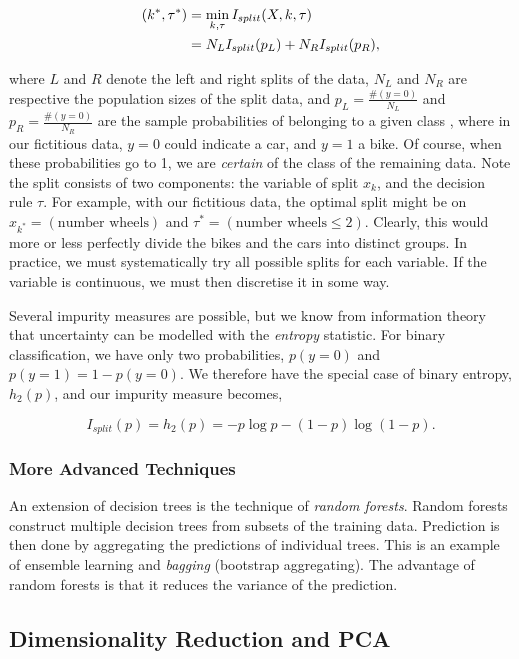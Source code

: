 \documentclass[11pt]{amsart}
\begin{document}
\begin{align}
( k^*, \tau^*) &= \min_{k, \tau} I_{split}(X, k, \tau) \notag \\
&= N_LI_{split}(p_L) + N_RI_{split}(p_R), \notag
\end{align}

where $L$ and $R$ denote the left and right splits of the data, $N_L$ and $N_R$ are respective the population sizes of the split data, and $p_L = \frac{\#(y = 0)}{N_L}$ and $p_R = \frac{\#(y = 0)}{N_R}$ are the sample probabilities of belonging to a given class , where in our fictitious data, $y=0$ could indicate a car, and $y=1$ a bike. Of course, when these probabilities go to 1, we are \emph{certain} of the class of the remaining data. Note the split consists of two components: the variable of split $x_k$, and the decision rule $\tau$. For example, with our fictitious data, the optimal split might be on $x_{k^*} = (\text{number wheels})$ and $\tau^* = (\text{number wheels} \leq 2)$. Clearly, this would more or less perfectly divide the bikes and the cars into distinct groups. In practice, we must systematically try all possible splits for each variable. If the variable is continuous, we must then discretise it in some way.

Several impurity measures are possible, but we know from information theory that uncertainty can be modelled with the \emph{entropy} statistic. For binary classification, we have only two probabilities, $p(y = 0)$ and $p(y=1) = 1 - p(y=0)$. We therefore have the special case of binary entropy, $h_2(p)$, and our impurity measure becomes,

$$I_{split}(p) = h_2(p) = -p\log p - (1-p)\log (1-p).$$

\subsubsection{More Advanced Techniques}

An extension of decision trees is the technique of \emph{random forests}. Random forests construct multiple decision trees from subsets of the training data. Prediction is then done by aggregating the predictions of individual trees. This is an example of ensemble learning and \emph{bagging} (bootstrap aggregating). The advantage of random forests is that it reduces the variance of the prediction.

\subsection{Dimensionality Reduction and PCA}
\end{document}
